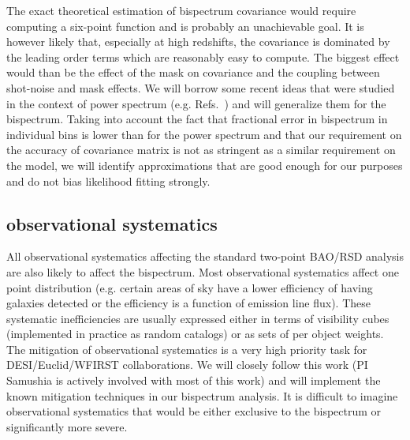 The exact theoretical estimation of bispectrum covariance would require
computing a six-point function and is probably an unachievable goal. It is
however likely that, especially at high redshifts, the covariance is dominated
by the leading order terms which are reasonably easy to compute. The biggest
effect would than be the effect of the mask on covariance and the coupling
between shot-noise and mask effects. We will borrow some recent ideas that were
studied in the context of power spectrum (e.g. Refs.~\cite{2008MNRAS.389..766P,2015MNRAS.454.4326P,2016MNRAS.457..993P,2016MNRAS.460.1567P,2016MNRAS.462.2681O}) and will
generalize them for the bispectrum. Taking into account the fact that
fractional error in bispectrum in individual bins is lower than for the power
spectrum and that our requirement on the accuracy of covariance matrix is not
as stringent as a similar requirement on the model, we will identify
approximations that are good enough for our purposes and do not bias likelihood
fitting strongly. 

\subsection*{observational systematics}

All observational systematics affecting the standard two-point BAO/RSD analysis
are also likely to affect the bispectrum. Most observational systematics affect
one point distribution (e.g. certain areas of sky have a lower efficiency of
having galaxies detected or the efficiency is a function of emission line
flux). These systematic inefficiencies are usually expressed either in terms of
visibility cubes (implemented in practice as random catalogs) or as sets of
per object weights. The mitigation of observational systematics is a very high
priority task for DESI/Euclid/WFIRST collaborations. We will closely follow
this work (PI Samushia is actively involved with most of this work) and will
implement the known mitigation techniques in our bispectrum analysis. It is
difficult to imagine observational systematics that would be either exclusive
to the bispectrum or significantly more severe.


